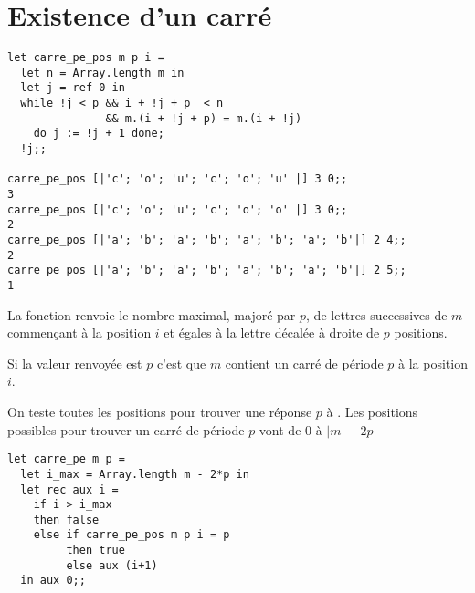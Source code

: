 \section{Existence d'un carré}
\begin{Exercise}
\begin{lstlisting}
let carre_pe_pos m p i =
  let n = Array.length m in
  let j = ref 0 in
  while !j < p && i + !j + p  < n 
               && m.(i + !j + p) = m.(i + !j)
    do j := !j + 1 done;
  !j;;
  
carre_pe_pos [|'c'; 'o'; 'u'; 'c'; 'o'; 'u' |] 3 0;;
3
carre_pe_pos [|'c'; 'o'; 'u'; 'c'; 'o'; 'o' |] 3 0;;
2
carre_pe_pos [|'a'; 'b'; 'a'; 'b'; 'a'; 'b'; 'a'; 'b'|] 2 4;;
2
carre_pe_pos [|'a'; 'b'; 'a'; 'b'; 'a'; 'b'; 'a'; 'b'|] 2 5;;
1
\end{lstlisting}
\end{Exercise}
\begin{Exercise}
La fonction renvoie le nombre maximal, majoré par $p$, de lettres successives de $m$ commençant à la position $i$ et égales à la lettre décalée à droite de $p$ positions.

Si la valeur renvoyée est $p$ c'est que $m$ contient un carré de période $p$ à la position $i$.
\end{Exercise}
\newpage
\begin{Exercise}
On teste toutes les positions pour trouver une réponse $p$ à  . Les positions possibles pour trouver un carré de période $p$ vont de 0 à $|m| - 2 p$
\begin{lstlisting}
let carre_pe m p =
  let i_max = Array.length m - 2*p in
  let rec aux i =
    if i > i_max 
    then false
    else if carre_pe_pos m p i = p
         then true
         else aux (i+1)
  in aux 0;;
\end{lstlisting}
\end{Exercise}
